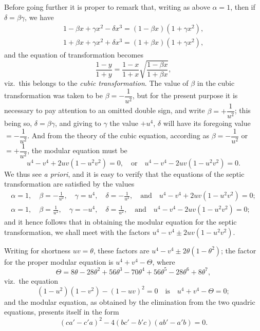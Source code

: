 \documentclass[11pt,a4paper]{book}
\begin{document}
Before going further it is proper to remark that, writing as above $\alpha = 1$, then if $\delta = \beta\gamma$, we have
\begin{gather*}
1 - \beta x + \gamma x^2 - \delta x^3 = (1 - \beta x)(1 + \gamma x^2),\\
1 + \beta x + \gamma x^2 + \delta x^3 = (1 + \beta x)(1 + \gamma x^2),
\end{gather*}
and the equation of transformation becomes
\[
\frac{1 - y}{1 + y} = \frac{1 - x}{1 + x}\sqrt{\frac{1 - \beta x}{1 + \beta x}},
\]
viz.\ this belongs to the \textit{cubic transformation}. The value of $\beta$ in the cubic transformation was taken to be $\beta = -\dfrac{1}{u^2}$, but for the present purpose it is necessary to pay attention to an omitted double sign, and write $\beta = +\dfrac{1}{u^2}$; this being so, $\delta = \beta\gamma$, and giving to $\gamma$ the value $+u^4$, $\delta$ will have its foregoing value $= -\dfrac{1}{u^2}$. And from the theory of the cubic equation, according as $\beta = -\dfrac{1}{u^2}$ or $= +\dfrac{1}{u^2}$, the modular equation must be
\[
u^4 - v^4 + 2uv(1 - u^2 v^2) = 0,\quad\text{or}\quad u^4 - v^4 - 2uv(1 - u^2 v^2) = 0.
\]
We thus see \textit{a priori}, and it is easy to verify that the equations of the septic transformation are satisfied by the values
\begin{gather*}
\alpha = 1,\quad \beta = -\frac{1}{u^2},\quad \gamma = u^4,\quad \delta = -\frac{1}{u^2},\quad\text{and}\quad u^4 - v^4 + 2uv(1 - u^2 v^2) = 0;\\
\alpha = 1,\quad \beta = \frac{1}{u^2},\quad \gamma = -u^4,\quad \delta = \frac{1}{u^2},\quad\text{and}\quad u^4 - v^4 - 2uv(1 - u^2 v^2) = 0;
\end{gather*}
and it hence follows that in obtaining the modular equation for the septic transformation, we shall meet with the factors $u^4 - v^4 \pm 2uv(1 - u^2 v^2)$.

Writing for shortness $uv = \theta$, these factors are $u^4 - v^4 \pm 2\theta(1 - \theta^2)$; the factor for the proper modular equation is $u^4 + v^4 - \Theta$, where
\[
\Theta = 8\theta - 28\theta^2 + 56\theta^3 - 70\theta^4 + 56\theta^5 - 28\theta^6 + 8\theta^7,
\]
viz.\ the equation
\[
(1 - u^2)(1 - v^2) - (1 - uv)^2 = 0\quad\text{is}\quad u^4 + v^4 - \Theta = 0;
\]
and the modular equation, as obtained by the elimination from the two quadric equations, presents itself in the form
\[
(ca' - c'a)^2 - 4(bc' - b'c)(ab' - a'b) = 0.
\]
\end{document}
